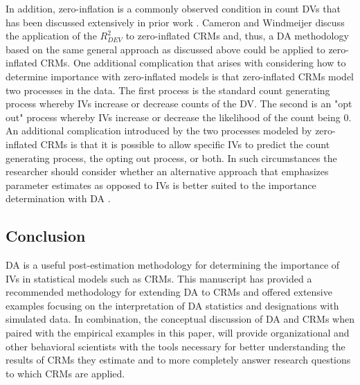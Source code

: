 \documentclass[man]{apa7}
\begin{document}
	In addition, zero-inflation is a commonly observed condition in count DVs that has been discussed extensively in prior work \parencite[e.g.,][]{blevins2015count}. 
	Cameron and Windmeijer \parencite*{cameron1996r} discuss the application of the $R^2_{DEV}$ to zero-inflated CRMs and, thus, a DA methodology based on the same general approach as discussed above could be applied to zero-inflated CRMs.
	One additional complication that arises with considering how to determine importance with zero-inflated models is that zero-inflated CRMs model two processes in the data. 
	The first process is the standard count generating process whereby IVs increase or decrease counts of the DV.
	The second is an "opt out" process whereby IVs increase or decrease the likelihood of the count being 0.
	An additional complication introduced by the two processes modeled by zero-inflated CRMs is that it is possible to allow specific IVs to predict the count generating process, the opting out process, or both.
	In such circumstances the researcher should consider whether an alternative approach that emphasizes parameter estimates as opposed to IVs is better suited to the importance determination with DA \parencite{luchman2020relative}.
	
	\subsection{Conclusion}
	
	DA is a useful post-estimation methodology for determining the importance of IVs in statistical models such as CRMs.
	This manuscript has provided a recommended methodology for extending DA to CRMs and offered extensive examples focusing on the interpretation of DA statistics and designations with simulated data.
	In combination, the conceptual discussion of DA and CRMs when paired with the empirical examples in this paper, will provide organizational and other behavioral scientists with the tools necessary for better understanding the results of CRMs they estimate and to more completely answer research questions to which CRMs are applied.

\printbibliography
	
\end{document}

